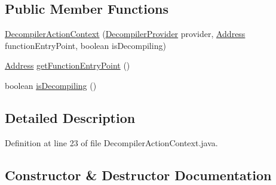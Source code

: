 \subsection*{Public Member Functions}
\begin{DoxyCompactItemize}
\item 
\mbox{\hyperlink{classghidra_1_1app_1_1plugin_1_1core_1_1decompile_1_1_decompiler_action_context_ae0dbbac7d212118061ba8598ab5360cc}{Decompiler\+Action\+Context}} (\mbox{\hyperlink{classghidra_1_1app_1_1plugin_1_1core_1_1decompile_1_1_decompiler_provider}{Decompiler\+Provider}} provider, \mbox{\hyperlink{class_address}{Address}} function\+Entry\+Point, boolean is\+Decompiling)
\item 
\mbox{\hyperlink{class_address}{Address}} \mbox{\hyperlink{classghidra_1_1app_1_1plugin_1_1core_1_1decompile_1_1_decompiler_action_context_a9c16b19e93bd3ab22f8231d8efa69e25}{get\+Function\+Entry\+Point}} ()
\item 
boolean \mbox{\hyperlink{classghidra_1_1app_1_1plugin_1_1core_1_1decompile_1_1_decompiler_action_context_ae27869d983ee6d09111ac16397bcd691}{is\+Decompiling}} ()
\end{DoxyCompactItemize}


\subsection{Detailed Description}


Definition at line 23 of file Decompiler\+Action\+Context.\+java.



\subsection{Constructor \& Destructor Documentation}
\mbox{\label{classghidra_1_1app_1_1plugin_1_1core_1_1decompile_1_1_decompiler_action_context_ae0dbbac7d212118061ba8598ab5360cc}} 
